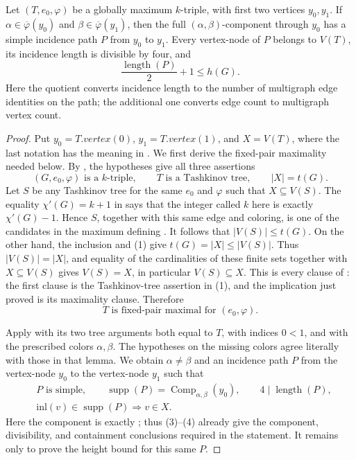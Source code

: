 \begin{lemma}
Let $(T,e_0,\varphi)$ be a globally maximum $k$-triple, with first two
vertices $y_0,y_1$.  If
$\alpha\in\overline\varphi(y_0)$ and
$\beta\in\overline\varphi(y_1)$, then the full
$(\alpha,\beta)$-component through $y_0$ has a simple incidence path $P$
from $y_0$ to $y_1$.  Every vertex-node of $P$ belongs to $V(T)$, its
incidence length is divisible by four, and
\[
 \frac{\operatorname{length}(P)}2+1\leq h(G).
\]
Here the quotient converts incidence length to the number of multigraph
edge identities on the path; the additional one converts edge count to
multigraph vertex count.
\end{lemma}
\begin{proof}
Put $y_0=T.vertex(0)$, $y_1=T.vertex(1)$, and
$X=V(T)$, where the last notation has the meaning in
.  We first derive the fixed-pair
maximality needed below.  By , the hypotheses
give all three assertions
\[
 (G,e_0,\varphi)\text{ is a $k$-triple},\qquad
 T\text{ is a Tashkinov tree},\qquad |X|=t(G).                \tag{1}
\]
Let $S$ be any Tashkinov tree for the same $e_0$ and $\varphi$ such that
$X\subseteq V(S)$.  The equality $\chi'(G)=k+1$ in
 says that the integer called $k$ here is exactly
$\chi'(G)-1$.  Hence $S$, together with this same edge and coloring, is
one of the candidates in the maximum defining .
It follows that $|V(S)|\leq t(G)$.  On the other hand, the inclusion and
(1) give $t(G)=|X|\leq |V(S)|$.  Thus $|V(S)|=|X|$, and equality of the
cardinalities of these finite sets together with $X\subseteq V(S)$ gives
$V(S)=X$, in particular $V(S)\subseteq X$.  This is every clause of
: the first clause is the
Tashkinov-tree assertion in (1), and the implication just proved is its
maximality clause.  Therefore
\[
 T\text{ is fixed-pair maximal for }(e_0,\varphi).                \tag{2}
\]

Apply  with its two tree arguments both
equal to $T$, with indices $0<1$, and with the prescribed colors
$\alpha,\beta$.  The hypotheses on the missing colors agree literally
with those in that lemma.  We obtain $\alpha\ne\beta$ and an incidence
path $P$ from the vertex-node $y_0$ to the vertex-node $y_1$ such that
\[
 \begin{split}
 &P\text{ is simple},\qquad
 \operatorname{supp}(P)=
   \operatorname{Comp}_{\alpha,\beta}(y_0),\qquad
 4\mid\operatorname{length}(P),                                   \tag{3}\\
 &\mathrm{inl}(v)\in\operatorname{supp}(P)
      \Longrightarrow v\in X.                                    \tag{4}
 \end{split}
\]
Here the component is exactly ; thus (3)--(4)
already give the component, divisibility, and containment conclusions
required in the statement.  It remains only to prove the height bound for
this same $P$.


\end{proof}
